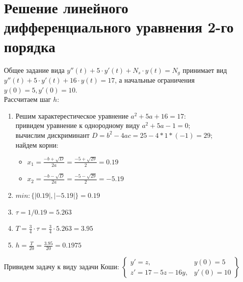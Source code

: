 \documentclass{article}
\begin{document}
\section{Решение линейного дифференциального уравнения 2-го порядка}
Общее задание вида $y''(t) + 5\cdot y'(t) + N_s \cdot y(t) = N_g$ принимает вид
$y''(t) + 5\cdot y'(t) + 16 \cdot y(t) = 17$, а начальные ограничения 
$y(0) = 5, y'(0) =10$. \\
Рассчитаем шаг $h$: \\
\begin{enumerate}
  \item Решим характерестическое уравнение $a^2 + 5a + 16 = 17$:\\
  привидем уравнение к однородному виду $a^2 + 5a -1 =0$;\\
  вычислим дискриминант $D = b^2-4ac = 25 -4*1*(-1) = 29$;\\
  найдем корни: 
  \begin{itemize}
    \item $x_1 = \frac{-b + \sqrt{D}}{2a} = \frac{-5 + \sqrt{29}}{2} = 0.19$
    \item $x_2 = \frac{-b - \sqrt{D}}{2a} = \frac{-5 - \sqrt{29}}{2} = -5.19$
  \end{itemize}
  
  \item $min: \{|0.19|, |-5.19| \} = 0.19$
  
  \item $\tau = 1/0.19 = 5.263$
   
  \item $T = \frac{3}{4} \cdot \tau = \frac{3}{4} \cdot 5.263 = 3.95$
  
  \item $h = \frac{T}{20} = \frac{3.95}{20} = 0.1975$
  
\end{enumerate}

Привидем задачу к виду задачи Коши:
\begin{math}
\left\{ 
\begin{array}{cc}
  y' = z,             & y(0) = 5 \\ 
  z' = 17 - 5z - 16y, & y'(0) = 10
\end{array}
\right\}
\end{math}
\end{document}
